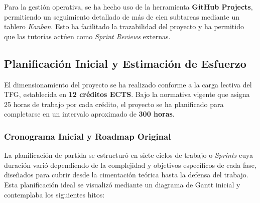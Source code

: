 Para la gestión operativa, se ha hecho uso de la herramienta \textbf{GitHub Projects}, permitiendo un seguimiento detallado de más de cien subtareas mediante un tablero \textit{Kanban}. Esto ha facilitado la trazabilidad del proyecto y ha permitido que las tutorías actúen como \textit{Sprint Reviews} externas.

\subsection{Planificación Inicial y Estimación de Esfuerzo}

El dimensionamiento del proyecto se ha realizado conforme a la carga lectiva del TFG, establecida en \textbf{12 créditos ECTS}. Bajo la normativa vigente que asigna 25 horas de trabajo por cada crédito, el proyecto se ha planificado para completarse en un intervalo aproximado de \textbf{300 horas}.

\subsubsection{Cronograma Inicial y Roadmap Original}

La planificación de partida se estructuró en siete ciclos de trabajo o \textit{Sprints} cuya duración varió dependiendo de la complejidad y objetivos específicos de cada fase, diseñados para cubrir desde la cimentación teórica hasta la defensa del trabajo. Esta planificación ideal se visualizó mediante un diagrama de Gantt inicial y contemplaba los siguientes hitos:

